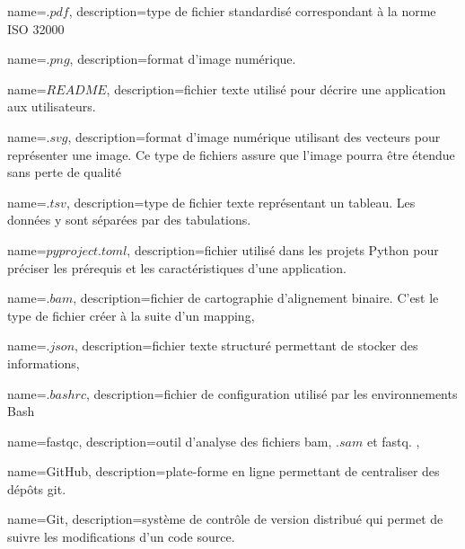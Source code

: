  {
    name=$.pdf$,
    description={type de fichier standardisé correspondant à la norme ISO 32000}
}
\newcommand{\pdf}{"\gls{pdf}"}

 {
    name=$.png$,
    description={format d'image numérique.}
}
\newcommand{\png}{"\gls{png}"}

 {
    name=$README$,
    description={fichier texte utilisé pour décrire une application aux utilisateurs.}
}
\newcommand{\readme}{\gls{readme}}


 {
   name=$.svg$,
    description={format d'image numérique utilisant des vecteurs pour représenter une image. Ce type de fichiers assure que l'image pourra être étendue sans perte de qualité }
}
\newcommand{\svg}{"\gls{svg}"}

 {
   name=$.tsv$,
    description={type de fichier texte représentant un tableau. Les données y sont séparées par des tabulations.}
}
\newcommand{\tsv}{"\gls{tsv}"}

 {
   name=$pyproject.toml$,
    description={fichier utilisé dans les projets \gls{Python} pour préciser les prérequis et les caractéristiques d'une application.}
}

 {
    name=$.bam$,
    description={fichier de cartographie d'alignement binaire. C'est le type de fichier créer à la suite d'un \gls{mapping}},
}
\newcommand{\bam}{"\gls{bam}"}

 {
    name=$.json$,
    description={fichier texte structuré permettant de stocker des informations},
}
\newcommand{\json}{"\gls{json}"}

 {
    name=$.bashrc$,
    description={fichier de configuration utilisé par les environnements \gls{Bash}}
}

 {
    name=fastqc,
    description={outil d'analyse des fichiers \gls{bam}, $.sam$ et \gls{fastq}. \cite{fastqc}},
}
\newcommand{\fastqc}{\gls{fastqc}}

 {
    name=GitHub,
    description={plate-forme en ligne permettant de centraliser des dépôts \gls{git}. \cite{github}}
}
\newcommand{\GitHub}{\gls{GitHub}}

 {
    name=Git,
    description={système de contrôle de version distribué qui permet de suivre les modifications d'un code source. \cite{git}}
}

